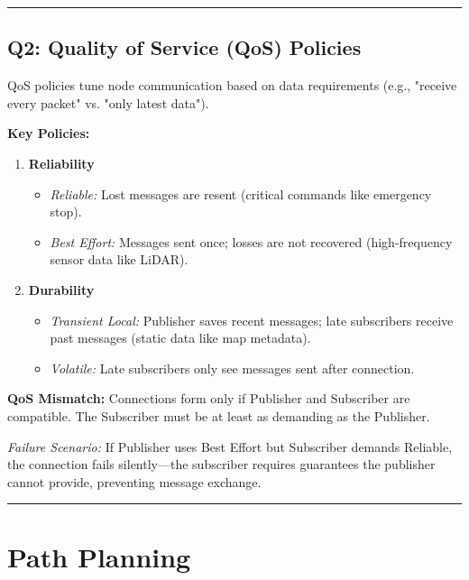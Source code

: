 \documentclass[12pt,a4paper]{article}
\begin{document}
\vspace{0.3em}
\noindent\rule{\textwidth}{0.4pt}
\vspace{0.3em}

\subsection{Q2: Quality of Service (QoS) Policies}

QoS policies tune node communication based on data requirements (e.g., "receive every packet" vs. "only latest data").

\noindent\textbf{Key Policies:}

\begin{enumerate}[leftmargin=*]
    \item \textbf{Reliability}
    \begin{itemize}
        \item \textit{Reliable:} Lost messages are resent (critical commands like emergency stop).
        \item \textit{Best Effort:} Messages sent once; losses are not recovered (high-frequency sensor data like LiDAR).
    \end{itemize}
    
    \item \textbf{Durability}
    \begin{itemize}
        \item \textit{Transient Local:} Publisher saves recent messages; late subscribers receive past messages (static data like map metadata).
        \item \textit{Volatile:} Late subscribers only see messages sent after connection.
    \end{itemize}
\end{enumerate}

\noindent\textbf{QoS Mismatch:} Connections form only if Publisher and Subscriber are compatible. The Subscriber must be at least as demanding as the Publisher.

\textit{Failure Scenario:} If Publisher uses Best Effort but Subscriber demands Reliable, the connection fails silently—the subscriber requires guarantees the publisher cannot provide, preventing message exchange.

\vspace{0.3em}
\noindent\rule{\textwidth}{0.4pt}
\vspace{0.3em}

\section{Path Planning}
\end{document}
